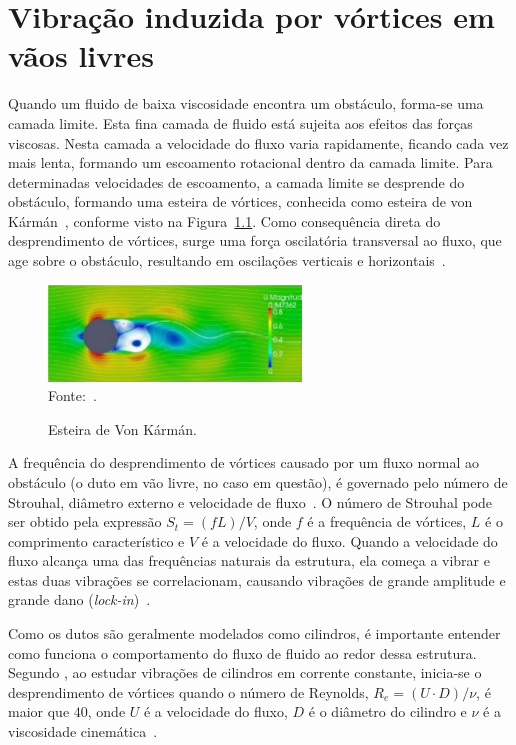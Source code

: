 \chapter{Vibração induzida por vórtices em vãos livres}

Quando um fluido de baixa viscosidade encontra um obstáculo, forma-se uma camada limite.
Esta fina camada de fluido está sujeita aos efeitos das forças viscosas.
Nesta camada a velocidade do fluxo varia rapidamente, ficando cada vez mais lenta, formando um escoamento rotacional dentro da camada limite.
Para determinadas velocidades de escoamento, a camada limite se desprende do obstáculo, formando uma esteira de vórtices, conhecida como esteira de von Kármán~\cite{Currie2002}, conforme visto na Figura~\ref{fig:viv_shading}.
Como consequência direta do desprendimento de vórtices, surge uma força oscilatória transversal ao fluxo, que age sobre o obstáculo, resultando em oscilações verticais e horizontais~\cite{Nielsen2002}.

\begin{figure}[!ht]
    \centering
    \caption{Esteira de Von Kármán.}\label{fig:viv_shading}
    \includegraphics[width=0.6\textwidth]{imagens/viv_shading}
    \\Fonte:~.
\end{figure}

A frequência do desprendimento de vórtices causado por um fluxo normal ao obstáculo (o duto em vão livre, no caso em questão), é governado pelo número de Strouhal, diâmetro externo e velocidade de fluxo~\cite{Mork2003}.
O número de Strouhal pode ser obtido pela expressão $S_t = (f L) / V$, onde $f$ é a frequência de vórtices, $L$ é o comprimento característico e $V$ é a velocidade do fluxo.
Quando a velocidade do fluxo alcança uma das frequências naturais da estrutura, ela começa a vibrar e estas duas vibrações se correlacionam, causando vibrações de grande amplitude e grande dano (\textit{lock-in})~\cite{Mork2003}.

Como os dutos são geralmente modelados como cilindros, é importante entender como funciona o comportamento do fluxo de fluido ao redor dessa estrutura. Segundo , ao estudar vibrações de cilindros em corrente constante, inicia-se o desprendimento de vórtices quando o número de Reynolds, $R_e = (U\cdot D)/\nu$, é maior que $40$, onde $U$ é a velocidade do fluxo, $D$ é o diâmetro do cilindro e $\nu$ é a viscosidade cinemática~\cite{Sumer1995}.

